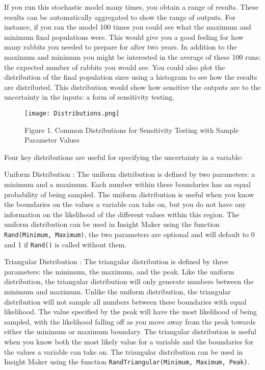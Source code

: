 \documentclass[]{memoir}
\let\Oldincludegraphics\includegraphics
\renewcommand{\includegraphics}[1]{\Oldincludegraphics[max size={\textwidth}{\textheight}]{#1}}
\begin{document}
If you run this stochastic model many times, you obtain a range of
results. These results can be automatically aggregated to show the range
of outputs. For instance, if you ran the model 100 times you could see
what the maximum and minimum final populations were. This would give you
a good feeling for how many rabbits you needed to prepare for after two
years. In addition to the maximum and minimum you might be interested in
the average of these 100 runs: the expected number of rabbits you would
see. You could also plot the distribution of the final population sizes
using a histogram to see how the results are distributed. This
distribution would show how sensitive the outputs are to the uncertainty
in the inputs: a form of sensitivity testing.

\begin{figure}[htbp]
\centering
\texttt{[image: Distributions.png]}
\caption{Figure 1. Common Distributions for Sensitivity Testing with
Sample Parameter Values}
\end{figure}

Four key distributions are useful for specifying the uncertainty in a
variable:

Uniform Distribution : The uniform distribution is defined by two
parameters: a minimum and a maximum. Each number within these boundaries
has an equal probability of being sampled. The uniform distribution is
useful when you know the boundaries on the values a variable can take
on, but you do not have any information on the likelihood of the
different values within this region. The uniform distribution can be
used in Insight Maker using the function
\lstinline!Rand(Minimum, Maximum)!, the two parameters are optional and
will default to 0 and 1 if \lstinline!Rand()! is called without them.

Triangular Distribution : The triangular distribution is defined by
three parameters: the minimum, the maximum, and the peak. Like the
uniform distribution, the triangular distribution will only generate
numbers between the minimum and maximum. Unlike the uniform
distribution, the triangular distribution will not sample all numbers
between these boundaries with equal likelihood. The value specified by
the peak will have the most likelihood of being sampled, with the
likelihood falling off as you move away from the peak towards either the
minimum or maximum boundary. The triangular distribution is useful when
you know both the most likely value for a variable and the boundaries
for the values a variable can take on. The triangular distribution can
be used in Insight Maker using the function
\lstinline!RandTriangular(Minimum, Maximum, Peak)!.
\end{document}
